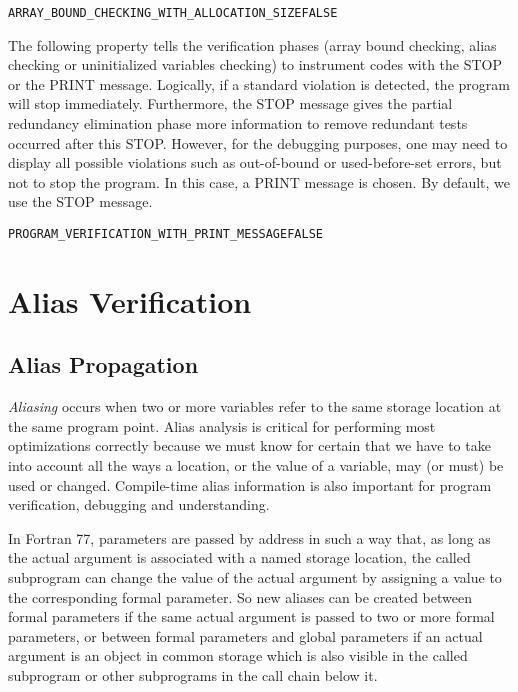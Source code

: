\documentclass[a4paper]{report}
\newenvironment{PipsProp}{\begin{alltt}}{\end{alltt}}
\begin{document}
\begin{PipsProp}
ARRAY_BOUND_CHECKING_WITH_ALLOCATION_SIZE FALSE
\end{PipsProp}

The following property tells the verification phases (array bound
checking, alias checking or uninitialized variables checking) to instrument
codes with the STOP or the PRINT message. Logically, if a standard violation
is detected, the program will stop immediately. Furthermore, the STOP message gives the
partial redundancy elimination phase more information to remove
redundant tests occurred after this STOP. However, for the debugging
purposes, one may need to display all possible violations such as
out-of-bound or used-before-set errors, but not
to stop the program. In this case, a PRINT message is chosen. By default,
we use the STOP message.

\begin{PipsProp}
PROGRAM_VERIFICATION_WITH_PRINT_MESSAGE FALSE
\end{PipsProp}



\section{Alias Verification}
\label{subsection-alias-verification}

\subsection{Alias Propagation}
\label{subsubsection-alias-propagation}


\textit {Aliasing} occurs when two or more variables refer to the same
storage location at the same program point. Alias analysis is critical for
performing most optimizations correctly because we must know for certain
that we have to take into account
all the ways a location, or the value of a variable, may (or must)
be used or changed. Compile-time alias information is also important for
program verification, debugging and understanding.

In Fortran 77, parameters are passed by address in such
a way that, as long as the actual argument is associated with a named
storage location, the called subprogram can change the value of the actual
argument by assigning a value to the corresponding formal parameter. So
new aliases can be created between formal parameters if the
same actual argument is passed to two or more formal parameters, or between formal
parameters and global parameters if an actual
argument is an object in common storage which is also visible in the
called subprogram or other subprograms in the call chain below it.
\end{document}
